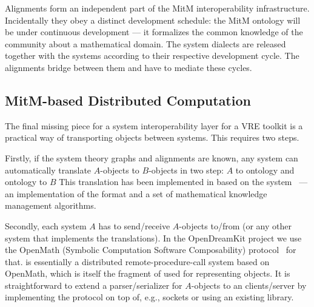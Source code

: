 Alignments form an independent part of the MitM interoperability infrastructure.
Incidentally they obey a distinct development schedule: the MitM ontology will be under continuous development --- it formalizes the common knowledge of the community about a mathematical domain.
The system dialects are released together with the systems according to their respective development cycle.
The alignments bridge between them and have to mediate these cycles.

\subsection{MitM-based Distributed Computation}\label{sec:mitm:comms}

The final missing piece for a system interoperability layer for a VRE toolkit is a practical way of transporting objects between systems.
This requires two steps.

Firstly, if the system theory graphs and alignments are known, any system can automatically translate $A$-objects to $B$-objects in two step: $A$ to ontology and ontology to $B$
This translation has been implemented in \cite{MueRoYuRa:abtafs17} based on the \MMT system~\cite{Rabe:MAGMS13,uniformal:on} --- an implementation of the \OMMT format and a set of mathematical knowledge management algorithms.

Secondly, each system $A$ has to send/receive $A$-objects to/from \MMT (or any other system that implements the translations).
In the OpenDreamKit project we use the OpenMath \SCSCP (Symbolic Computation Software Composability) protocol~\cite{SCSCP-1.3} for that. 
\SCSCP is essentially a distributed remote-procedure-call system based on OpenMath, which is itself the fragment of \OMMT used for representing objects.
It is straightforward to extend a parser/serializer for $A$-objects to an \SCSCP clients/server by implementing the \SCSCP protocol on top of, e.g., sockets or using an existing \SCSCP library. 

